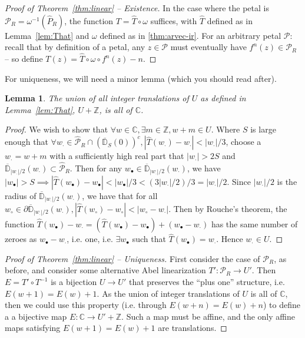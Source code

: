 \documentclass{article}
\newtheorem{lem}{Lemma}
\begin{document}
\begin{proof}[Proof of Theorem~\ref{thm:linear} -- Existence]
    In the case where the petal is $\mathcal{P}_R = \omega^{-1}(\hat{P}_R)$, the function $T=\hat{T}\circ\omega$ suffices, with $\hat{T}$ defined as in Lemma~\ref{lem:That} and $\omega$ defined as in \ref{thm:arvec-ir}. For an arbitrary petal $\mathcal{P}$: recall that by definition of a petal, any $z\in\mathcal{P}$ must eventually have $f^n(z)\in\mathcal{P}_R$ -- so define $T(z)=\hat{T}\circ\omega\circ f^n(z) - n$.
\end{proof}

For uniqueness, we will need a minor lemma (which you should read after).

\begin{lem}
    \label{lem:strip}
    The union of all integer translations of $U$ as defined in Lemma~\ref{lem:That}, $U+\mathbb{Z}$, is all of $\mathbb{C}$. 
\end{lem}
\begin{proof}
    We wish to show that $\forall w\in\mathbb{C}, \exists m\in\mathbb{Z}, w+m\in U$. Where $S$ is large enough that $\forall w_\cdot\in\hat{\mathcal{P}}_R\cap(\overline{\mathbb{D}}_S(0))^c, |\hat{T}(w_\cdot)-w_\cdot|<|w_\cdot|/3$, choose a $w_\cdot=w+m$ with a sufficiently high real part that $|w_\cdot|>2S$ and $\overline{\mathbb{D}}_{|w_\cdot|/2}(w_\cdot)\subset \hat{\mathcal{P}}_R$. Then for any $w_{\bullet}\in\overline{\mathbb{D}}_{|w_\cdot|/2}(w_\cdot)$, we have $|w_{\bullet}|>S\implies |\hat{T}(w_{\bullet})-w_{\bullet}|<|w_{\bullet}|/3<(3|w_\cdot|/2)/3=|w_\cdot|/2$. Since $|w_\cdot|/2$ is the radius of $\overline{\mathbb{D}}_{|w_\cdot|/2}(w_\cdot)$, we have that for all $w_{\circ}\in\partial\overline{\mathbb{D}}_{|w_\cdot|/2}(w_\cdot), |\hat{T}(w_{\circ})-w_{\circ}| < |w_{\circ}-w_\cdot|$. Then by Rouche's theorem, the function $\hat{T}(w_\bullet)-w_\cdot=(\hat{T}(w_\bullet)-w_\bullet)+(w_\bullet-w_\cdot)$ has the same number of zeroes as $w_\bullet-w_\cdot$, i.e. one, i.e. $\exists w_\bullet$ such that $\hat{T}(w_\bullet)=w_\cdot$. Hence $w_\cdot\in U$.
\end{proof}

\begin{proof}[Proof of Theorem~\ref{thm:linear} -- Uniqueness]
    First consider the case of $\mathcal{P}_R$, as before, and consider some alternative Abel linearization $T': \mathcal{P}_R\to U'$. Then $E=T'\circ T^{-1}$ is a bijection $U\to U'$ that preserves the ``plus one'' structure, i.e. $E(w+1)=E(w)+1$. As the union of integer translations of $U$ is all of $\mathbb{C}$, then we could use this property (i.e. through $E(w+n)=E(w)+n$) to define a a bijective map $E:\mathbb{C}\to U'+\mathbb{Z}$. Such a map must be affine, and the only affine maps satisfying $E(w+1)=E(w)+1$ are translations.
\end{proof}
\end{document}
